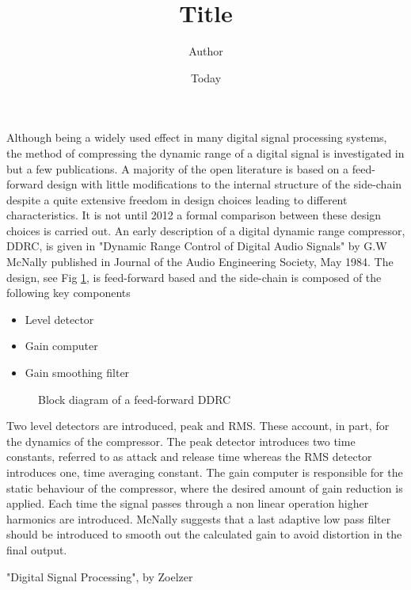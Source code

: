 \documentclass[]{article}
\begin{document}
\title{Title}
\author{Author}
\date{Today}
\maketitle
\section*{}
Although being a widely used effect in many digital signal processing systems, the method of compressing the dynamic range of a digital signal is investigated in but a few publications. A majority of the open literature is based on a feed-forward design with little modifications to the internal structure of the side-chain despite a quite extensive freedom in design choices leading to different characteristics. It is not until 2012 a formal comparison between these design choices is carried out.  An early description of a digital dynamic range compressor, DDRC, is given in "Dynamic Range Control of Digital Audio Signals" by G.W McNally published in Journal of the Audio Engineering Society, May 1984. The design, see Fig \ref{fig:mcnaBlock}, is feed-forward based and the side-chain is composed of the following key components
\begin{itemize}
\item{Level detector}
\item{Gain computer}
\item{Gain smoothing filter}
\end{itemize}
\begin{figure}
\caption{Block diagram of a feed-forward DDRC}
\label{fig:mcnaBlock}
\end{figure}
Two level detectors are introduced, peak and RMS. These account, in part, for the dynamics of the compressor. The peak detector introduces two time constants, referred to as attack and release time whereas the RMS detector introduces one, time averaging constant. The gain computer is responsible for the static behaviour of the compressor, where the desired amount of gain reduction is applied. Each time the signal passes through a non linear operation higher harmonics are introduced. McNally suggests that a last adaptive low pass filter should be introduced to smooth out the calculated gain to avoid distortion in the final output.

"Digital Signal Processing", by Zoelzer 



\end{document}

